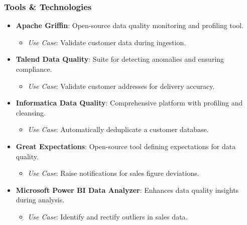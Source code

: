 \documentclass{beamer}
\begin{document}
\begin{frame}[fragile]
    \frametitle{Tools & Technologies}
    \begin{itemize}
        \item \textbf{Apache Griffin}: Open-source data quality monitoring and profiling tool.
        \begin{itemize}
            \item \textit{Use Case}: Validate customer data during ingestion.
        \end{itemize}
        
        \item \textbf{Talend Data Quality}: Suite for detecting anomalies and ensuring compliance.
        \begin{itemize}
            \item \textit{Use Case}: Validate customer addresses for delivery accuracy.
        \end{itemize}
        
        \item \textbf{Informatica Data Quality}: Comprehensive platform with profiling and cleansing.
        \begin{itemize}
            \item \textit{Use Case}: Automatically deduplicate a customer database.
        \end{itemize}
        
        \item \textbf{Great Expectations}: Open-source tool defining expectations for data quality.
        \begin{itemize}
            \item \textit{Use Case}: Raise notifications for sales figure deviations.
        \end{itemize}
        
        \item \textbf{Microsoft Power BI Data Analyzer}: Enhances data quality insights during analysis.
        \begin{itemize}
            \item \textit{Use Case}: Identify and rectify outliers in sales data.
        \end{itemize}
    \end{itemize}
\end{frame}
\end{document}
